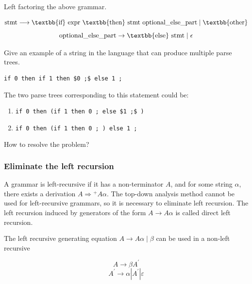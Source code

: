 \documentclass[a4paper]{exam}
\begin{document}
Left factoring the above grammar.

\begin{solution}
$$\text{stmt} \longrightarrow \text{\textbb{if} expr \textbb{then} stmt optional\_else\_part} \\ \mid \text{\textbb{other}}$$
$$\text{optional\_else\_part} \rightarrow \text{\textbb{else} stmt} \mid \epsilon$$
\end{solution}

Give an example of a string in the language that can produce multiple parse trees.

\begin{solution}
\begin{verbatim}
if 0 then if 1 then $0 ;$ else 1 ;
\end{verbatim}
The two parse trees corresponding to this statement could be:
\begin{enumerate}
    \item \begin{verbatim}
if 0 then (if 1 then 0 ; else $1 ;$ )
\end{verbatim}
\item \begin{verbatim}
if 0 then (if 1 then 0 ; ) else 1 ;
\end{verbatim}
\end{enumerate}
\end{solution}
How to resolve the problem?

\begin{solution}

\end{solution}

\subsubsection{Eliminate the left recursion}
A grammar is left-recursive if it has a non-terminator $A$, and for some string $\alpha$, there exists a derivation $A \Rightarrow{ }^{+} A \alpha$. The top-down analysis method cannot be used for left-recursive grammars, so it is necessary to eliminate left recursion. The left recursion induced by generators of the form $A \rightarrow A \alpha$ is called direct left recursion.

The left recursive generating equation $A \rightarrow A \alpha \mid \beta$ can be used in a non-left recursive

$$A \rightarrow \beta A^{\prime}$$
$$A^{\prime} \rightarrow \alpha\left|A^{\prime}\right| \varepsilon$$
\end{document}
